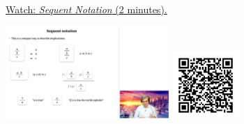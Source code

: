 
\begin{minipage}{10cm}
    \href{https://act4e-spring21.netlify.app/videos/spring2021-tradeoffs:sequent-notation.html}{Watch: \emph{Sequent Notation} (2 minutes).}
        
    \href{https://act4e-spring21.netlify.app/videos/spring2021-tradeoffs:sequent-notation.html}{\includegraphics[height=3.5cm]{spring2021-tradeoffs:sequent-notation/thumbnails.jpg}}
    \href{https://act4e-spring21.netlify.app/videos/spring2021-tradeoffs:sequent-notation.html}{\includegraphics[height=2.5cm]{spring2021-tradeoffs:sequent-notation/qrcode.png}}
\end{minipage}
